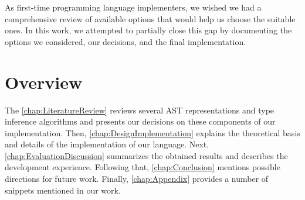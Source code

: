 As first-time programming language implementers, we wished we had a comprehensive review of available options that would help us choose the suitable ones. In this work, we attempted to partially close this gap by documenting the options we considered, our decisions, and the final implementation.

\newpage

\section{Overview}

The \cref{chap:LiteratureReview} reviews several AST representations and type inference algorithms and presents our decisions on these components of our implementation.
Then, \cref{chap:DesignImplementation} explains the theoretical basis and details of the implementation of our language.
Next, \cref{chap:EvaluationDiscussion} summarizes the obtained results and describes the development experience.
Following that, \cref{chap:Conclusion} mentions possible directions for future work.
Finally, \cref{chap:Appendix} provides a number of snippets mentioned in our work.
